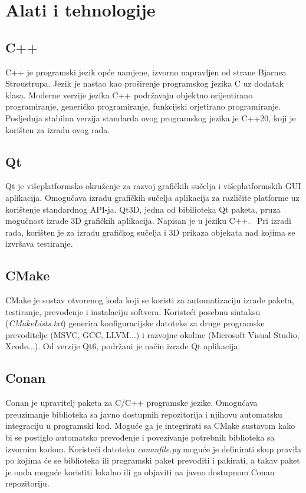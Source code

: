 \chapter{Alati i tehnologije}

\section{C++}

C++ je programski jezik opće namjene, izvorno napravljen od strane Bjarnea Stroustrupa.
Jezik je nastao kao proširenje programskog jezika C uz dodatak klasa. Moderne verzije jezika C++
podržavaju objektno orijentirano programiranje, generičko programiranje, funkcijski orjetirano programiranje.
Posljednja stabilna verzija standarda ovog programskog jezika je C++20, koji je korišten za izradu ovog rada.~\cite{cpp}

\section{Qt}

Qt je višeplatformsko okruženje za razvoj grafičkih sučelja i višeplatformskih GUI aplikacija.
Omogučava izradu grafičkih sučelja aplikacija za različite platforme uz korištenje standardnog API-ja.
Qt3D, jedna od bibilioteka Qt paketa, pruza mogučnost izrade 3D grafičkih aplikacija. Napisan je u jeziku C++.~\cite{qt}
Pri izradi rada, korišten je za izradu grafičkog sučelja i 3D prikaza objekata nad kojima se izvršava testiranje.

\section{CMake}

CMake je sustav otvorenog koda koji se koristi za automatizaciju izrade paketa, testiranje, prevođenje i instalaciju
softvera. Koristeći posebnu sintaksu (\textit{CMakeLists.txt}) generira konfiguracijske datoteke za druge programske prevoditelje
(MSVC, GCC, LLVM...) i razvojne okoline (Microsoft Visual Studio, Xcode...). Od verzije Qt6, podržani je način izrade Qt aplikacija. ~\cite{cmake}

\pagebreak
\section{Conan}

Conan je upravitelj paketa za C/C++ programske jezike. Omogućava preuzimanje biblioteka sa javno dostupnih repozitorija
i njihovu automatsku integraciju u programski kod. Moguće ga je integrirati sa CMake sustavom kako bi se postiglo automatsko
prevođenje i povezivanje potrebnih biblioteka sa izvornim kodom. Koristeći datoteku \textit{conanfile.py} moguće je definirati
skup pravila po kojima će se biblioteka ili programski paket prevoditi i pakirati, a takav paket je onda moguće koristiti lokalno
ili ga objaviti na javno dostupnom Conan repozitoriju.

